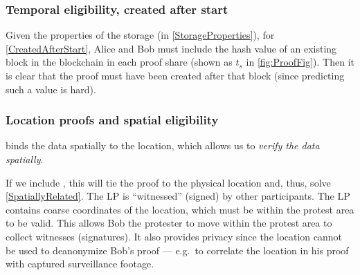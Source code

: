 \subsubsection{Temporal eligibility, created after start}

Given the properties of the storage (in \cref{StorageProperties}), for 
\cref{CreatedAfterStart}, Alice and Bob must include the hash value of an 
existing block in the blockchain in each proof share (shown as \(t_s\) in 
\cref{fig:ProofFig}).
Then it is clear that the proof must have been created after that block (since 
predicting such a value is hard).

\subsubsection{Location proofs and spatial eligibility}

 binds the data spatially to the location, which allows 
us to \emph{verify the data spatially}.

If we include , this will tie the proof to the physical location and, 
thus, solve \cref{SpatiallyRelated}.
The \ac{LP} is \enquote{witnessed} (signed) by other participants.
The \ac{LP} contains coarse coordinates of the location, which must be within 
the protest area to be valid.
This allows Bob the protester to move within the protest area to collect 
witnesses (signatures).
It also provides privacy since the location cannot be used to deanonymize Bob's 
proof --- e.g.\ to correlate the location in his proof with captured 
surveillance footage.


